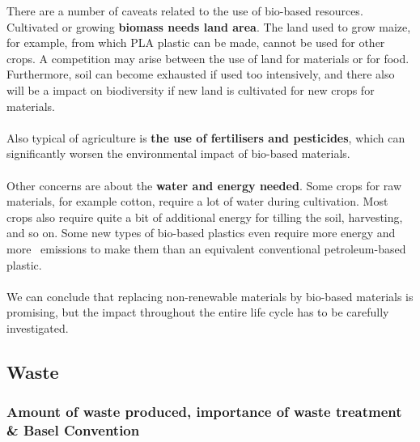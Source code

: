 \documentclass[../summary.tex]{subfiles}
\begin{document}
There are a number of caveats related to the use of bio-based resources. Cultivated or growing \textbf{biomass needs land area}. The land used to grow maize, for example, from which PLA plastic can be made, cannot be used for other crops. A competition may arise between the use of land for materials or for food. Furthermore, soil can become exhausted if used too intensively, and there also will be a impact on biodiversity if new land is cultivated for new crops for materials.
\\\\
Also typical of agriculture is \textbf{the use of fertilisers and pesticides}, which can significantly worsen the environmental impact of bio-based materials.
\\\\
Other concerns are about the \textbf{water and energy needed}. Some crops for raw materials, for example cotton, require a lot of water during cultivation. Most crops also require quite a bit of additional energy for tilling the soil, harvesting, and so on. Some new types of bio-based plastics even require more energy and more \COtwo\ emissions to make them than an equivalent conventional petroleum-based plastic.
\\\\
We can conclude that replacing non-renewable materials by bio-based materials is promising, but the impact throughout the entire life cycle has to be carefully investigated.

\subsection{Waste}
\subsubsection{Amount of waste produced, importance of waste treatment \& Basel Convention}
\end{document}
